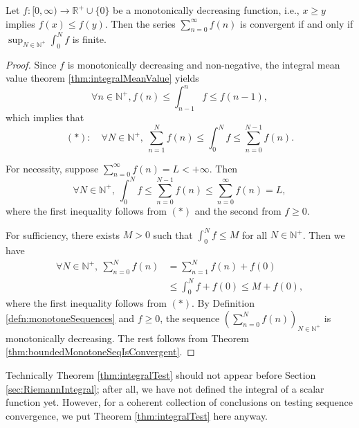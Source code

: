 \begin{thm}
  \label{thm:integralTest}
  Let $f:[0, \infty)\rightarrow \mathbb{R}^+\cup\{0\}$
   be a monotonically decreasing function,
   i.e., $x\ge y$ implies $f(x)\le f(y)$.
  Then the series $\sum_{n=0}^{\infty}f(n)$ is convergent if and only if
   $\sup_{N\in\mathbb{N}^+}\int_0^N f$ is finite.
\end{thm}
\begin{proof}
  Since $f$ is monotonically decreasing and non-negative,
  the integral mean value theorem \ref{thm:integralMeanValue}
  yields
  \begin{displaymath}
    \forall n\in \mathbb{N}^{+}, f(n)\le \int_{n-1}^{n}f\le f(n-1),
  \end{displaymath}
  which implies that
  \begin{displaymath}
    (*):\quad
    \forall N\in \mathbb{N}^{+},\ 
    \sum_{n=1}^{N}f(n)\le \int_{0}^{N}f \le \sum_{n=0}^{N-1}f(n).
  \end{displaymath}
  
  For necessity, suppose $\sum_{n=0}^{\infty}f(n)=L<+\infty$.
  Then 
  \begin{displaymath}
    \forall N\in \mathbb{N}^+,\ 
    \int_{0}^{N}f\le\sum_{n=0}^{N-1}f(n)\le\sum_{n=0}^{\infty}f(n)=L,
  \end{displaymath}
  where the first inequality follows from $(*)$
  and the second from $f\ge 0$. 


  For sufficiency, there exists $M>0$ such that
  $\int_{0}^{N}f\le M$ for all $N\in \mathbb{N}^{+}$.
  Then we have
  \begin{align*}
    \forall N\in \mathbb{N}^{+},\ 
    \sum_{n=0}^{N}f(n)&=\sum_{n=1}^{N}f(n)+f(0) \\
    &\le \int_{0}^{N}f+f(0)
    \le M+f(0),
  \end{align*}
  where the first inequality follows from $(*)$.
  By Definition \ref{defn:monotoneSequences}
  and $f\ge 0$, 
  the sequence $(\sum_{n=0}^{N}f(n))_{N\in \mathbb{N}^{+}}$
  is monotonically decreasing.
  The rest follows from
  Theorem \ref{thm:boundedMonotoneSeqIsConvergent}.
\end{proof}

\begin{rem}
  Technically Theorem \ref{thm:integralTest}
  should not appear before Section \ref{sec:RiemannIntegral};
  after all,
  we have not defined the integral of a scalar function yet.
  However, for a coherent collection of conclusions
  on testing sequence convergence, 
  we put Theorem \ref{thm:integralTest} here anyway. 
\end{rem}

